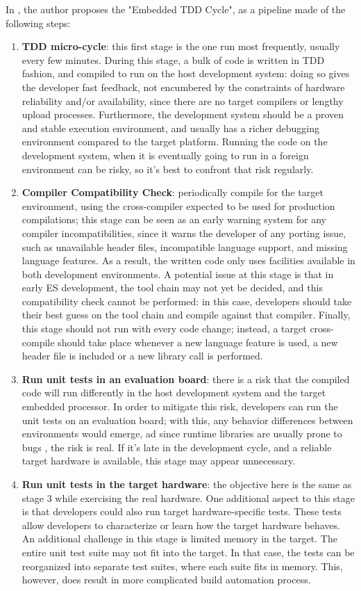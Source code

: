 \noindent In \cite{TDDEC}, the author proposes the "Embedded TDD Cycle", as a pipeline made of the following steps:
\begin{enumerate}
    \item \textbf{TDD micro-cycle}: this first stage is the one run most frequently, usually every few minutes. During this stage, a bulk of code is written in TDD fashion, and compiled to run on the host development system: doing so gives the developer fast feedback, not encumbered by the constraints of hardware reliability and/or availability, since there are no target compilers or lengthy upload processes. Furthermore, the development system should be a proven and stable execution environment, and usually has a richer debugging environment compared to the target platform. 
    Running the code on the development system, when it is eventually going to run in a foreign environment can be risky, so it's best to confront that risk regularly.
    \item \textbf{Compiler Compatibility Check}: periodically compile for the target environment, using the cross-compiler expected to be used for production compilations; this stage can be seen as an early warning system for any compiler incompatibilities, since it warns the developer of any porting issue, such as unavailable header files, incompatible language support, and missing language features. As a result, the written code only uses facilities available in both development environments.
    A potential issue at this stage is that in early ES development, the tool chain may not yet be decided, and this compatibility check cannot be performed: in this case, developers should take their best guess on the tool chain and compile against that compiler.
    Finally, this stage should not run with every code change; instead, a target cross-compile should take place whenever a new language feature is used, a new header file is included or a new library call is performed.
    \item \textbf{Run unit tests in an evaluation board}: there is a risk that the compiled code will run differently in the host development system and the target embedded processor. In order to mitigate this risk, developers can run the unit tests on an evaluation board; with this, any behavior differences between environments would emerge, ad since runtime libraries are usually prone to bugs \cite{TDDEC}, the risk is real. If it's late in the development cycle, and a reliable target hardware is available, this stage may appear unnecessary.
    \item \textbf{Run unit tests in the target hardware}: the objective here is the same as stage 3 while exercising the real hardware. One additional aspect to this stage is that developers could also run target hardware-specific tests. These tests allow developers to characterize or learn how the target hardware behaves. An additional challenge in this stage is limited memory in the target. The entire unit test suite may not fit into the target. In that case, the tests can be reorganized into separate test suites, where each suite fits in memory. This, however, does result in more complicated build automation process.

\end{enumerate}
